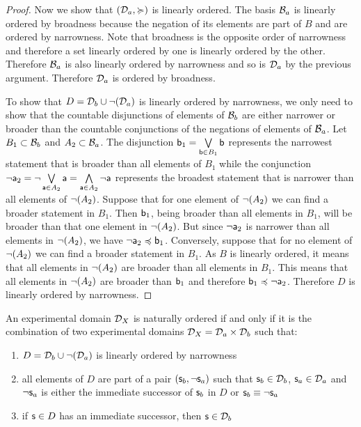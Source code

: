 \begin{mathSection}
\begin{proof}
		Now we show that $(\edomain_a, \broader)$ is linearly ordered. The basis $\basis_a$ is linearly ordered by broadness because the negation of its elements are part of $B$ and are ordered by narrowness. Note that broadness is the opposite order of narrowness and therefore a set linearly ordered by one is linearly ordered by the other. Therefore $\basis_a$ is also linearly ordered by narrowness and so is $\edomain_a$ by the previous argument. Therefore $\edomain_a$ is ordered by broadness.
		
		To show that $D=\edomain_b \cup \NOT (\edomain_a)$ is linearly ordered by narrowness, we only need to show that the countable disjunctions of elements of $\basis_b$ are either narrower or broader than the countable conjunctions of the negations of elements of $\basis_a$. Let $B_1 \subset \basis_b$ and $A_2 \subset \basis_a$. The disjunction $\stmt[b]_1 = \bigOR\limits_{\stmt[b] \in B_1} \stmt[b]$ represents the narrowest statement that is broader than all elements of $B_1$ while the conjunction $\NOT \stmt[a]_2 = \NOT \bigOR\limits_{\stmt[a] \in A_2} \stmt[a] = \bigAND\limits_{\stmt[a] \in A_2} \NOT \stmt[a]$ represents the broadest statement that is narrower than all elements of $\NOT(A_2)$. Suppose that for one element of $\NOT(A_2)$ we can find a broader statement in $B_1$. Then $\stmt[b]_1$, being broader than all elements in $B_1$, will be broader than that one element in $\NOT(A_2)$. But since $\NOT \stmt[a]_2$ is narrower than all elements in $\NOT(A_2)$, we have $\NOT \stmt[a]_2 \narrower \stmt[b]_1$. Conversely, suppose that for no element of $\NOT(A_2)$ we can find a broader statement in $B_1$. As $B$ is linearly ordered, it means that all elements in $\NOT(A_2)$ are broader than all elements in $B_1$. This means that all elements in $\NOT(A_2)$ are broader than $\stmt[b]_1$ and therefore $\stmt[b]_1 \narrower \NOT \stmt[a]_2$. Therefore $D$ is linearly ordered by narrowness.
	\end{proof}
	
	\begin{thrm}\label{pm-pq-domainOrderingTheorem}
		An experimental domain $\edomain_X$ is naturally ordered if and only if it is the combination of two experimental domains $\edomain_X = \edomain_a \times \edomain_b$ such that:
		\begin{enumerate}[label=(\roman*)]
			\item $D = \edomain_b \cup \NOT(\edomain_a)$ is linearly ordered by narrowness
			\item all elements of $D$ are part of a pair $(\stmt_b, \NOT \stmt_a)$ such that $\stmt_b \in \edomain_b$, $\stmt_a \in \edomain_a$ and $\NOT \stmt_a$ is either the immediate successor of $\stmt_b$ in $D$ or $\stmt_b \equiv \NOT \stmt_a$
			\item if $\stmt \in D$ has an immediate successor, then $\stmt \in \edomain_b$
		\end{enumerate}
	\end{thrm}
	

\end{mathSection}
